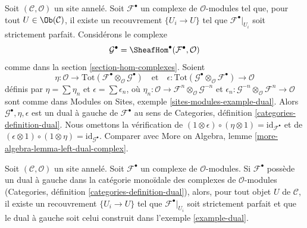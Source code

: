 \begin{example}
\label{example-dual}
Soit $(\mathcal{C}, \mathcal{O})$ un site annelé. Soit
$\mathcal{F}^\bullet$ un complexe de $\mathcal{O}$-modules tel que, pour tout
$U \in \Ob(\mathcal{C})$, il existe un recouvrement $\{U_i \to U\}$ tel que
$\mathcal{F}^\bullet|_{U_i}$ soit strictement parfait. Considérons le complexe
$$
\mathcal{G}^\bullet = \SheafHom^\bullet(\mathcal{F}^\bullet, \mathcal{O})
$$
comme dans la section \ref{section-hom-complexes}. Soient
$$
\eta :
\mathcal{O}
\to
\text{Tot}(\mathcal{F}^\bullet \otimes_\mathcal{O} \mathcal{G}^\bullet)
\quad\text{et}\quad
\epsilon :
\text{Tot}(\mathcal{G}^\bullet \otimes_\mathcal{O} \mathcal{F}^\bullet)
\to
\mathcal{O}
$$
définis par $\eta = \sum \eta_n$ et $\epsilon = \sum \epsilon_n$, où
$\eta_n : \mathcal{O} \to
\mathcal{F}^n \otimes_\mathcal{O} \mathcal{G}^{-n}$
et
$\epsilon_n : \mathcal{G}^{-n} \otimes_\mathcal{O} \mathcal{F}^n
\to \mathcal{O}$ sont comme dans Modules on Sites, exemple
\ref{sites-modules-example-dual}. Alors
$\mathcal{G}^\bullet, \eta, \epsilon$ est un dual à gauche de
$\mathcal{F}^\bullet$ au sens de Categories, définition
\ref{categories-definition-dual}. Nous omettons la vérification de
$(1 \otimes \epsilon) \circ (\eta \otimes 1) = \text{id}_{\mathcal{F}^\bullet}$
et de
$(\epsilon \otimes 1) \circ (1 \otimes \eta) =
\text{id}_{\mathcal{G}^\bullet}$. Comparer avec More on Algebra, lemme
\ref{more-algebra-lemma-left-dual-complex}.
\end{example}

\begin{lemma}
\label{lemma-left-dual-complex}
Soit $(\mathcal{C}, \mathcal{O})$ un site annelé. Soit
$\mathcal{F}^\bullet$ un complexe de $\mathcal{O}$-modules. Si
$\mathcal{F}^\bullet$ possède un dual à gauche dans la catégorie monoïdale
des complexes de $\mathcal{O}$-modules (Categories, définition
\ref{categories-definition-dual}), alors, pour tout objet $U$ de
$\mathcal{C}$, il existe un recouvrement $\{U_i \to U\}$ tel que
$\mathcal{F}^\bullet|_{U_i}$ soit strictement parfait et que le dual à gauche
soit celui construit dans l'exemple \ref{example-dual}.
\end{lemma}

